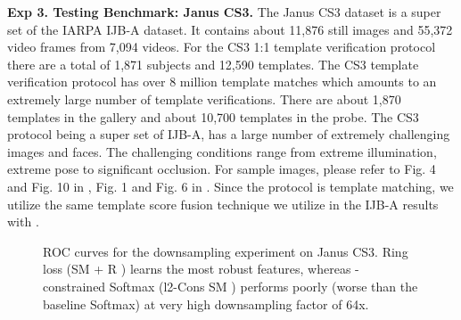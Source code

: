 \documentclass[10pt,twocolumn,letterpaper]{article}
\begin{document}
\textbf{Exp 3. Testing Benchmark: Janus CS3.} The Janus CS3 dataset is a super set of the IARPA IJB-A dataset. It contains about 11,876 still images and 55,372 video frames from 7,094 videos. For the CS3 1:1 template verification protocol there are a total of 1,871 subjects and 12,590 templates. The CS3 template verification protocol has over 8 million template matches which amounts to an extremely large number of template verifications. There are about 1,870 templates in the gallery and about 10,700 templates in the probe. The CS3 protocol being a super set of IJB-A, has a large number of extremely challenging images and faces. The challenging conditions range from extreme illumination, extreme pose to significant occlusion. For sample images, please refer to Fig. 4 and Fig. 10 in \cite{lin2017proximity}, Fig. 1 and Fig. 6 in \cite{bodla2017deep}. Since the protocol is template matching, we utilize the same template score fusion technique we utilize in the IJB-A results with .

\begin{figure*}\begin{center}
    \end{center}
    \vspace{-0.5cm}
\caption{ ROC curves for the downsampling experiment on Janus CS3. Ring loss (SM + R ) learns the most robust features, whereas -constrained Softmax (l2-Cons SM ) \cite{ranjan2017l2} performs poorly (worse than the baseline Softmax) at very high downsampling factor of 64x. }
\label{fig_scale2}
\vspace{-0.5cm}
\end{figure*}
\end{document}
